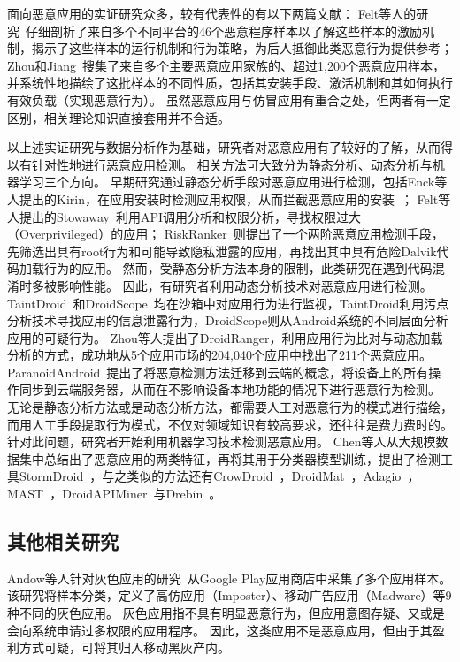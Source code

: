 面向恶意应用的实证研究众多，较有代表性的有以下两篇文献：
Felt等人的研究~\cite{Felt2011ASO}仔细剖析了来自多个不同平台的46个恶意程序样本以了解这些样本的激励机制，揭示了这些样本的运行机制和行为策略，为后人抵御此类恶意行为提供参考；
Zhou和Jiang~\cite{Zhou2012DissectingAM}搜集了来自多个主要恶意应用家族的、超过1,200个恶意应用样本，并系统性地描绘了这批样本的不同性质，包括其安装手段、激活机制和其如何执行有效负载（实现恶意行为）。
虽然恶意应用与仿冒应用有重合之处，但两者有一定区别，相关理论知识直接套用并不合适。

以上述实证研究与数据分析作为基础，研究者对恶意应用有了较好的了解，从而得以有针对性地进行恶意应用检测。
相关方法可大致分为静态分析、动态分析与机器学习三个方向。
早期研究通过静态分析手段对恶意应用进行检测，包括Enck等人提出的Kirin，在应用安装时检测应用权限，从而拦截恶意应用的安装~\cite{enck2009lightweight}；
Felt等人提出的Stowaway~\cite{felt2011android}利用API调用分析和权限分析，寻找权限过大（Overprivileged）的应用；
RiskRanker~\cite{grace2012riskranker}则提出了一个两阶恶意应用检测手段，先筛选出具有root行为和可能导致隐私泄露的应用，再找出其中具有危险Dalvik代码加载行为的应用。
然而，受静态分析方法本身的限制，此类研究在遇到代码混淆时多被影响性能。
因此，有研究者利用动态分析技术对恶意应用进行检测。
TaintDroid~\cite{enck2014taintdroid}和DroidScope~\cite{yan2012droidscope}均在沙箱中对应用行为进行监视，TaintDroid利用污点分析技术寻找应用的信息泄露行为，DroidScope则从Android系统的不同层面分析应用的可疑行为。
Zhou等人\cite{zhou2012hey}提出了DroidRanger，利用应用行为比对与动态加载分析的方式，成功地从5个应用市场的204,040个应用中找出了211个恶意应用。
ParanoidAndroid~\cite{portokalidis2010paranoid}提出了将恶意检测方法迁移到云端的概念，将设备上的所有操作同步到云端服务器，从而在不影响设备本地功能的情况下进行恶意行为检测。
无论是静态分析方法或是动态分析方法，都需要人工对恶意行为的模式进行描绘，而用人工手段提取行为模式，不仅对领域知识有较高要求，还往往是费力费时的。
针对此问题，研究者开始利用机器学习技术检测恶意应用。
Chen等人从大规模数据集中总结出了恶意应用的两类特征，再将其用于分类器模型训练，提出了检测工具StormDroid~\cite{chen2016stormdroid}，与之类似的方法还有CrowDroid~\cite{burguera2011crowdroid}，DroidMat~\cite{wu2012droidmat}，Adagio~\cite{gascon2013structural}，MAST~\cite{chakradeo2013mast}，DroidAPIMiner~\cite{aafer2013droidapiminer}与Drebin~\cite{arp2014drebin}。

\subsection{其他相关研究}
Andow等人针对灰色应用的研究~\cite{Andow2016ASO}从Google Play应用商店中采集了多个应用样本。
该研究将样本分类，定义了高仿应用（Imposter）、移动广告应用（Madware）等9种不同的灰色应用。
灰色应用指不具有明显恶意行为，但应用意图存疑、又或是会向系统申请过多权限的应用程序。
因此，这类应用不是恶意应用，但由于其盈利方式可疑，可将其归入移动黑灰产内。

